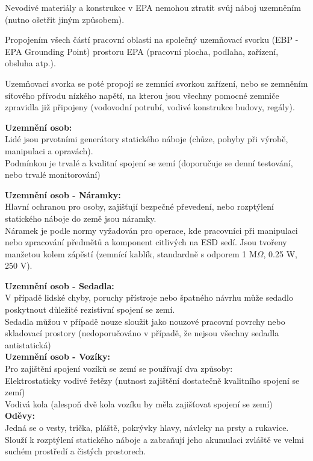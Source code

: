 Nevodivé materiály a konstrukce v EPA nemohou ztratit svůj náboj uzemněním (nutno
ošetřit jiným způsobem).

Propojením všech částí pracovní oblasti na společný uzemňovací svorku (EBP -
EPA Grounding Point) prostoru EPA (pracovní plocha, podlaha, zařízení, obsluha
atp.).

Uzemňovací svorka se poté propojí se zemnící svorkou zařízení, nebo se
zemněním síťového přívodu nízkého napětí, na kterou jsou všechny pomocné
zemniče zpravidla již připojeny (vodovodní potrubí, vodivé konstrukce budovy,
regály).

\textbf{Uzemnění osob:}\\
Lidé jsou prvotními generátory statického náboje (chůze, pohyby při výrobě,
manipulaci a opravách).\\
Podmínkou je trvalé a kvalitní spojení se zemí (doporučuje se denní testování,
nebo trvalé monitorování)

\textbf{Uzemnění osob - Náramky:}\\
Hlavní ochranou pro osoby, zajišťují bezpečné převedení,
nebo rozptýlení statického náboje do země jsou náramky.\\
Náramek je podle normy vyžadován pro operace, kde
pracovníci při manipulaci nebo zpracování předmětů a
komponent citlivých na ESD sedí. Jsou tvořeny manžetou kolem zápěstí (zemnící kablík, standardně s odporem 1 M$\Omega$, 0.25 W, 250 V).

\textbf{Uzemnění osob - Sedadla:}\\
V případě lidské chyby, poruchy přístroje nebo špatného
návrhu může sedadlo poskytnout důležité rezistivní spojení
se zemí.\\
Sedadla můžou v případě nouze sloužit jako nouzové
pracovní povrchy nebo skladovací prostory (nedoporučováno v případě, že nejsou všechny sedadla antistatická)\\

\textbf{Uzemnění osob - Vozíky:}\\
Pro zajištění spojení vozíků se zemí se používají dva způsoby:\\
Elektrostaticky vodivé řetězy (nutnost zajištění dostatečně
kvalitního spojení se zemí)\\
Vodivá kola (alespoň dvě kola vozíku by měla zajišťovat
spojení se zemí)\\

\textbf{Oděvy:}\\
Jedná se o vesty, trička, pláště, pokrývky hlavy, návleky na prsty a rukavice.\\
Slouží k rozptýlení statického náboje a zabraňují jeho akumulaci zvláště ve velmi
suchém prostředí a čistých prostorech.\\

